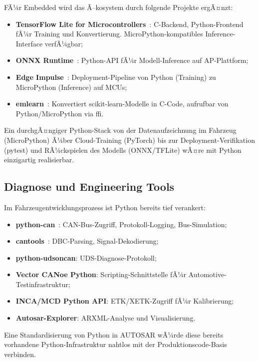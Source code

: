 ﻿\documentclass[12pt,a4paper,twoside]{article}
\begin{document}
FÃ¼r Embedded wird das Ã–kosystem durch folgende Projekte ergÃ¤nzt:
\begin{itemize}
  \item \textbf{TensorFlow Lite for Microcontrollers}~\cite{tflite_micro2021}:
        C-Backend, Python-Frontend fÃ¼r Training und Konvertierung.
        MicroPython-kompatibles Inference-Interface verfÃ¼gbar;
  \item \textbf{ONNX Runtime}~\cite{onnxruntime2019}: Python-API fÃ¼r
        Modell-Inference auf AP-Plattform;
  \item \textbf{Edge Impulse}~\cite{edgeimpulse2023}: Deployment-Pipeline
        von Python (Training) zu MicroPython (Inference) auf MCUs;
  \item \textbf{emlearn}~\cite{emlearn2023}: Konvertiert scikit-learn-Modelle
        in C-Code, aufrufbar von Python/MicroPython via \gls{ffi}.
\end{itemize}

Ein durchgÃ¤ngiger Python-Stack von der Datenaufzeichnung im Fahrzeug
(MicroPython) Ã¼ber Cloud-Training (PyTorch) bis zur Deployment-Verifikation
(pytest) und RÃ¼ckspielen des Modells (ONNX/TFLite) wÃ¤re
mit Python einzigartig realisierbar.

\subsection{Diagnose und Engineering Tools}
\label{subsec:diagnose}

Im Fahrzeugentwicklungsprozess ist Python bereits tief verankert:
\begin{itemize}
  \item \textbf{python-can}~\cite{python_can2023}: CAN-Bus-Zugriff,
        Protokoll-Logging, Bus-Simulation;
  \item \textbf{cantools}~\cite{cantools2022}: DBC-Parsing, Signal-Dekodierung;
  \item \textbf{python-udsoncan}: UDS-Diagnose-Protokoll;
  \item \textbf{Vector CANoe Python}: Scripting-Schnittstelle fÃ¼r
        Automotive-Testinfrastruktur;
  \item \textbf{INCA/MCD Python API}: ETK/XETK-Zugriff fÃ¼r Kalibrierung;
  \item \textbf{Autosar-Explorer}: ARXML-Analyse und Visualisierung.
\end{itemize}

Eine Standardisierung von Python in AUTOSAR wÃ¼rde diese bereits
vorhandene Python-Infrastruktur nahtlos mit der Produktionscode-Basis verbinden.
\end{document}
